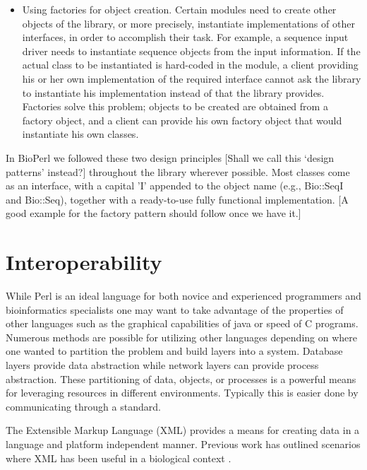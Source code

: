 \documentclass{article}
\begin{document}
\begin{twocolumn}
\begin{itemize}

\item Using factories for object creation.  Certain modules need to
create other objects of the library, or more precisely, instantiate
implementations of other interfaces, in order to accomplish their
task.  For example, a sequence input driver needs to instantiate
sequence objects from the input information.  If the actual class to be
instantiated is hard-coded in the module, a client providing his or
her own implementation of the required interface cannot ask the
library to instantiate his implementation instead of that the library
provides.  Factories solve this problem; objects to be created are
obtained from a factory object, and a client can provide his own
factory object that would instantiate his own classes.

\end{itemize}

In BioPerl we followed these two design principles [Shall we call this
`design patterns' instead?] throughout the library wherever
possible.  Most classes come as an interface, with a capital 'I'
appended to the object name (e.g., Bio::SeqI and Bio::Seq), together
with a ready-to-use fully functional implementation.  [A good example
for the factory pattern should follow once we have it.]

\section{Interoperability}


While Perl is an ideal language for both novice and experienced
programmers and bioinformatics specialists one may want to take
advantage of the properties of other languages such as the graphical
capabilities of java or speed of C programs.  Numerous methods are
possible for utilizing other languages depending on where one wanted
to partition the problem and build layers into a system.  Database
layers provide data abstraction while network layers can provide
process abstraction.  These partitioning of data, objects, or
processes is a powerful means for leveraging resources in different
environments.  Typically this is easier done by communicating through
a standard.  

The Extensible Markup Language (XML) provides a means for creating
data in a language and platform independent manner.  Previous work has
outlined scenarios where XML has been useful in a biological context
\cite{xml_bioinformatics}.  


\end{twocolumn}
\end{document}

